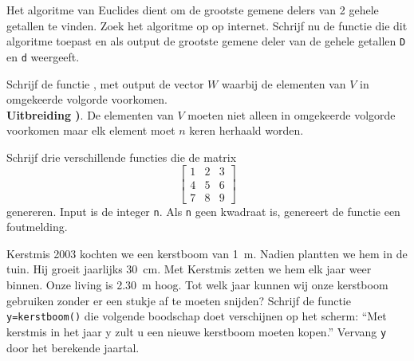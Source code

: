 \begin{oef}
Het algoritme van Euclides dient  om de grootste gemene delers van 2 gehele getallen
te vinden. Zoek het algoritme op op internet. Schrijf nu de functie 
 die dit algoritme toepast en als output de grootste gemene deler van de gehele getallen \verb+D+ en \verb+d+ weergeeft.

\begin{opl}
\end{opl}
\end{oef}

\begin{oef}
Schrijf de functie , met output de vector $W$ 
waarbij de elementen van $V$ in omgekeerde volgorde voorkomen.\\
\textbf{Uitbreiding  )}. De elementen van $V$ 
moeten niet alleen in omgekeerde volgorde voorkomen maar elk element 
moet $n$ keren herhaald worden.

\begin{opl}
\end{opl}
\end{oef}

\begin{oef}
Schrijf drie verschillende functies die de matrix 
\begin{equation*}
\begin{bmatrix}
 1&2  &3  \\
 4& 5 &6 \\
 7& 8 &9
\end{bmatrix}
\end{equation*}
genereren. Input is de integer \verb+n+. Als \verb+n+ geen kwadraat is, genereert de functie een foutmelding.
\end{oef}

\begin{oef}
Kerstmis 2003 kochten we een kerstboom van \SI{1}{\meter}. Nadien plantten we hem in de tuin. Hij groeit jaarlijks \SI{30}{\centi\meter}. Met Kerstmis zetten we hem elk jaar weer binnen. Onze living is \SI{2,30}{\meter} hoog. Tot welk jaar kunnen wij onze kerstboom gebruiken zonder er een stukje af te moeten snijden? Schrijf de functie \verb/y=kerstboom()/ die volgende boodschap doet verschijnen op het scherm: ``Met kerstmis in het jaar y zult u een nieuwe kerstboom moeten kopen.'' Vervang \verb/y/ door het berekende jaartal.
\begin{opl}
\end{opl}
\end{oef}


